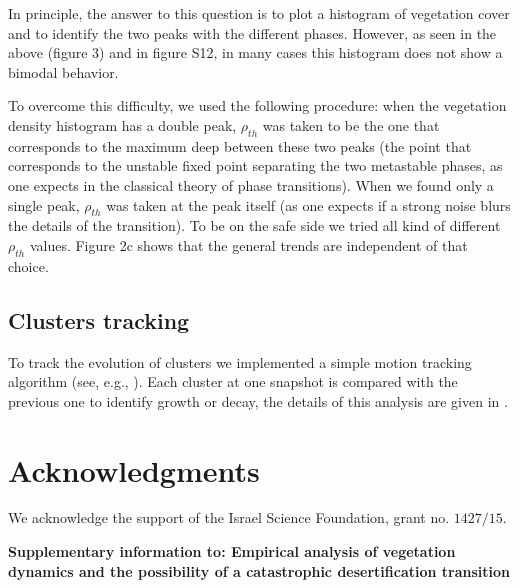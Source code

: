 \documentclass[aps,pre,twocolumn]{revtex4-1}
\begin{document}
In principle, the answer to this question is to plot a histogram of vegetation cover and to identify the two peaks with the different phases. However, as seen in the above (figure 3)
and in figure S12, in many cases this histogram does not show a bimodal behavior.

To overcome this difficulty, we  used the following procedure: when the vegetation density histogram has a double peak, $\rho_{th}$ was taken to be the one that corresponds to the maximum deep between these two peaks (the point that corresponds to the unstable fixed point separating the two metastable phases, as one expects in the classical theory of phase transitions). When we found only a single peak, $\rho_{th}$ was taken at the peak itself (as one expects if a strong noise blurs the details of the transition). To be on the safe side we tried all kind of different $\rho_{th}$ values. Figure 2c  shows that the general trends are independent of that choice.

\subsection{Clusters tracking} To track the evolution of clusters we  implemented a simple motion tracking algorithm (see, e.g., \cite{seri2012neutral,falkowski2006mining,hartmann2014clustering}). Each cluster at one snapshot is compared with the previous one to identify growth or decay, the details of this analysis are given in \cite{weissmann2016predicting}.

\section{\bf Acknowledgments} We acknowledge the support of the Israel
Science Foundation, grant no. $1427/15$.


%



%
%

\onecolumngrid
\pagebreak

\setcounter{equation}{0}
\setcounter{section}{0}
\setcounter{figure}{0}
\setcounter{table}{0}
\setcounter{page}{1}
\makeatletter
\renewcommand{\theequation}{S\arabic{equation}}
\renewcommand{\thefigure}{S\arabic{figure}}

\begin{center}
\Large{\bf{Supplementary information to: Empirical analysis of vegetation dynamics and the possibility of a catastrophic desertification transition}}
\end{center}
\end{document}
